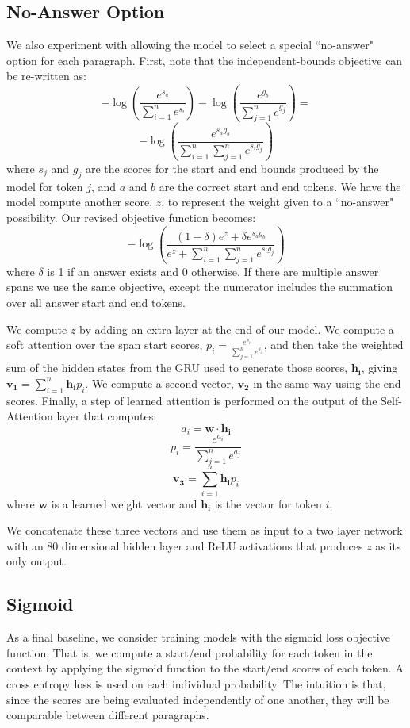 \documentclass[11pt,a4paper]{article}
\renewcommand{\vec}[1]{\mathbf{#1}}
\begin{document}
\subsection{No-Answer Option}
We also experiment with allowing the model to select a special ``no-answer" option for each paragraph. First, note that the independent-bounds objective can be re-written as:
%
$$ -\log\left(\frac{e^{s_a}}{\sum^n_{i=1} e^{s_i}}\right) - \log\left(\frac{e^{g_b}}{\sum^n_{j=1} e^{g_j}}\right) = $$
$$ -\log\left(\frac{e^{s_a g_b}}{\sum^n_{i=1} \sum^n_{j=1} e^{s_i g_j}} \right) $$
%
where $s_j$ and $g_j$ are the scores for the start and end bounds produced by the model for token $j$, and $a$ and $b$ are the correct start and end tokens. We have the model compute another score, $z$, to represent the weight given to a ``no-answer" possibility. Our revised objective function becomes:
%
$$ 
-\log\left(\frac{(1 - \delta)e^z + \delta e^{s_a g_b}}{e^z + \sum^n_{i=1} \sum^n_{j=1} e^{s_i g_j} } \right)
$$
%
where $\delta$ is 1 if an answer exists and 0 otherwise. If there are multiple answer spans we use the same objective, except the numerator includes the summation over all answer start and end tokens.

We compute $z$ by adding an extra layer at the end of our model. We compute a soft attention over the span start scores, $p_i = \frac{e^{s_i}}{\sum^n_{j=1}e^ {s_j}}$, and then take the weighted sum of the hidden states from the GRU used to generate those scores, $\vec{h_i}$, giving $\vec{v_1} = \sum^n_{i=1} \vec{h_i} p_i$. We compute a second vector, $\vec{v_2}$ in the same way using the end scores. Finally, a step of learned attention is performed on the output of the Self-Attention layer that computes:
%
$$ a_i = \vec{w} \cdot \vec{h_i} $$
$$ p_i = \frac{e^{a_i}}{\sum^n_{j=1} e^{a_j}} $$
$$ \vec{v_3} = \sum^n_{i=1} \vec{h_i} p_i $$
%
where $\vec{w}$ is a learned weight vector and $\vec{h_i}$ is the vector for token $i$.

We concatenate these three vectors and use them as input to a two layer network with an 80 dimensional hidden layer and ReLU activations that produces $z$ as its only output.

\subsection{Sigmoid}
As a final baseline, we consider training models with the sigmoid loss objective function. That is, we compute a start/end probability for each token in the context by applying the sigmoid function to the start/end scores of each token. A cross entropy loss is used on each individual probability. The intuition is that, since the scores are being evaluated independently of one another, they will be comparable between different paragraphs. 
\end{document}
